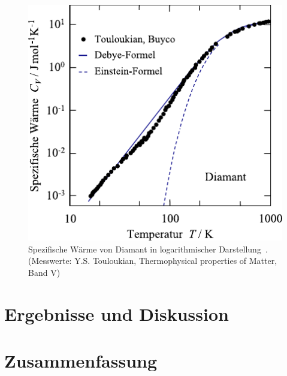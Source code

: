 \documentclass[parskip=half, a4paper,twoside,final]{article}
\begin{document}
\begin{figure}[htp]
  \centering
  \includegraphics{Bilder/Debye_Einstein.pdf}
  \caption{Spezifische Wärme von Diamant in logarithmischer Darstellung~\cite{Hunklinger}. (Messwerte: Y.S. Touloukian, Thermophysical properties of Matter, Band V)}
  \label{fig:Debye_Einstein}
\end{figure}
\newpage
\section{Ergebnisse und Diskussion}\label{sec:ErgebnisseUndDiskussion}

\newpage
\section{Zusammenfassung}


{}

\end{document}
